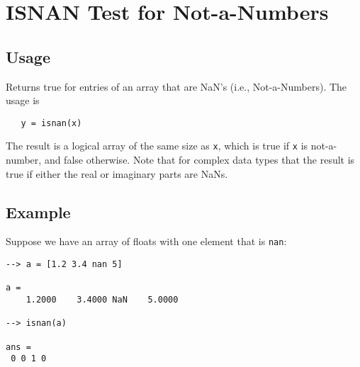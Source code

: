 \section{ISNAN Test for Not-a-Numbers}

\subsection{Usage}

Returns true for entries of an array that are NaN's (i.e.,
Not-a-Numbers).  The usage is
\begin{verbatim}
   y = isnan(x)
\end{verbatim}
The result is a logical array of the same size as \verb|x|,
which is true if \verb|x| is not-a-number, and false otherwise.
Note that for complex data types that
the result is true if either the real or imaginary parts
are NaNs.
\subsection{Example}

Suppose we have an array of floats with one element that
is \verb|nan|:
\begin{verbatim}
--> a = [1.2 3.4 nan 5]

a = 
    1.2000    3.4000 NaN    5.0000 

--> isnan(a)

ans = 
 0 0 1 0 
\end{verbatim}
